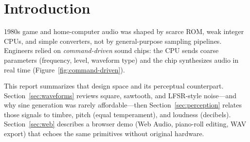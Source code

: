 \section{Introduction}
\label{sec:intro}

1980s game and home-computer audio was shaped by scarce ROM, weak integer CPUs, and simple converters, not by general-purpose sampling pipelines.
Engineers relied on \emph{command-driven} sound chips: the CPU sends coarse parameters (frequency, level, waveform type) and the chip synthesizes audio in real time (Figure~\ref{fig:command-driven}).

This report summarizes that design space and its perceptual counterpart.
Section~\ref{sec:waveforms} reviews square, sawtooth, and LFSR-style noise---and why sine generation was rarely affordable---then Section~\ref{sec:perception} relates those signals to timbre, pitch (equal temperament), and loudness (decibels).
Section~\ref{sec:web} describes a browser demo (Web Audio, piano-roll editing, WAV export) that echoes the same primitives without original hardware.
